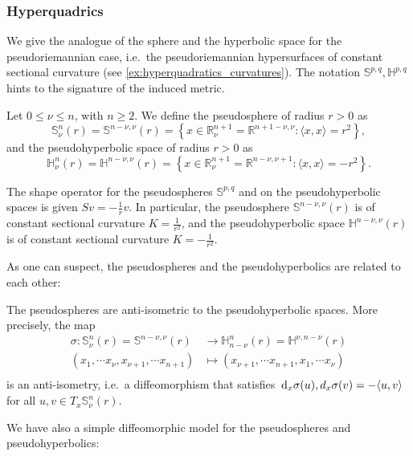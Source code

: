 \documentclass{report}
\begin{document}
\subsubsection{Hyperquadrics}
We give the analogue of the sphere and the hyperbolic space for the pseudoriemannian case, i.e.\ the pseudoriemannian hypersurfaces of constant sectional curvature (see \cref{ex:hyperquadratics_curvatures}).
The notation $\mathbb S^{p,q}, \mathbb H^{p,q}$ hints to the signature of the induced metric.
\begin{definition}
    Let $0 \leq \nu \leq n$, with $n \geq 2$.
    We define the pseudosphere of radius $r > 0$ as
    \[
    \mathbb S^n_\nu(r) = \mathbb S^{n-\nu,\nu}(r) = \left\{ x \in \mathbb R^{n+1}_\nu = \mathbb R^{n+1-\nu,\nu} : \langle x,x \rangle = r^2 \right\},
    \]
    and the pseudohyperbolic space of radius $r > 0$ as
    \[
    \mathbb H^n_\nu(r) = \mathbb H^{n - \nu, \nu}(r) = \left\{ x \in \mathbb R^{n+1}_\nu = \mathbb R^{n-\nu, \nu + 1} : \langle x,x \rangle = -r^2 \right\}.
    \]
\end{definition}
\begin{example}\label{ex:hyperquadratics_curvatures}
    The shape operator for the pseudospheres $\mathbb S^{p,q}$ and on the pseudohyperbolic spaces is given $Sv = -\frac{1}{r} v$.
    In particular, the  pseudosphere $\mathbb S^{n - \nu, \nu}(r)$ is of constant sectional curvature $K = \frac{1}{r^2}$, and the pseudohyperbolic space $\mathbb H^{n - \nu, \nu}(r)$ is of constant sectional curvature $K = -\frac{1}{r^2}$.
\end{example}
As one can suspect, the pseudospheres and the pseudohyperbolics are related to each other:
\begin{proposition}
    The pseudospheres are anti-isometric to the pseudohyperbolic spaces.
    More precisely, the map
    \begin{align*}
        \sigma: \mathbb S^n_\nu(r) = \mathbb S^{n - \nu, \nu}(r) &\to \mathbb H^n_{n - \nu}(r) = \mathbb H^{\nu, n - \nu}(r)\\
        (x_1, \cdots x_\nu, x_{\nu+1}, \cdots x_{n+1}) &\mapsto (x_{\nu+1}, \cdots x_{n+1}, x_1, \cdots x_\nu)\\
    \end{align*}
    is an anti-isometry, i.e.\ a diffeomorphism that satisfies $\,\mathrm{d}_x \sigma (u), d_x \sigma (v) = -\langle u, v \rangle$ for all $u,v \in T_x \mathbb S^n_\nu(r)$.
\end{proposition}
We have also a simple diffeomorphic model for the pseudospheres and pseudohyperbolics:
\end{document}
